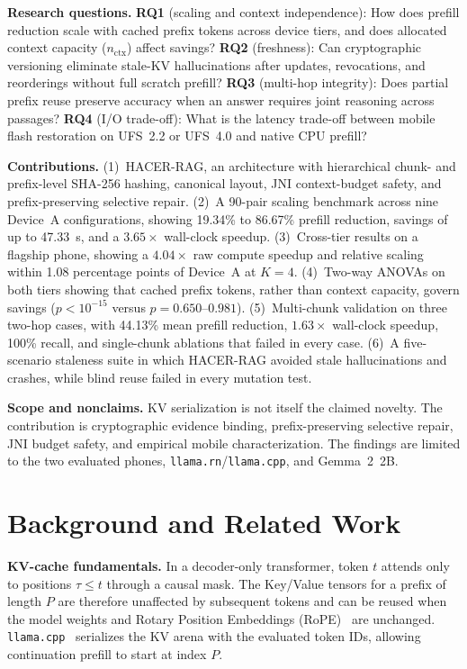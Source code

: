 \documentclass[10pt,conference]{IEEEtran}
\newcommand{\systemname}{HACER-RAG}
\begin{document}
\textbf{Research questions.} \textbf{RQ1} (scaling and context independence): How does prefill reduction scale with cached prefix tokens across device tiers, and does allocated context capacity ($n_{\text{ctx}}$) affect savings? \textbf{RQ2} (freshness): Can cryptographic versioning eliminate stale-KV hallucinations after updates, revocations, and reorderings without full scratch prefill? \textbf{RQ3} (multi-hop integrity): Does partial prefix reuse preserve accuracy when an answer requires joint reasoning across passages? \textbf{RQ4} (I/O trade-off): What is the latency trade-off between mobile flash restoration on UFS~2.2 or UFS~4.0 and native CPU prefill?

\textbf{Contributions.} (1)~\systemname{}, an architecture with hierarchical chunk- and prefix-level SHA-256 hashing, canonical layout, JNI context-budget safety, and prefix-preserving selective repair. (2)~A 90-pair scaling benchmark across nine Device~A configurations, showing 19.34\% to 86.67\% prefill reduction, savings of up to 47.33~s, and a $3.65\times$ wall-clock speedup. (3)~Cross-tier results on a flagship phone, showing a $4.04\times$ raw compute speedup and relative scaling within 1.08 percentage points of Device~A at $K{=}4$. (4)~Two-way ANOVAs on both tiers showing that cached prefix tokens, rather than context capacity, govern savings ($p<10^{-15}$ versus $p=0.650\text{--}0.981$). (5)~Multi-chunk validation on three two-hop cases, with 44.13\% mean prefill reduction, $1.63\times$ wall-clock speedup, 100\% recall, and single-chunk ablations that failed in every case. (6)~A five-scenario staleness suite in which \systemname{} avoided stale hallucinations and crashes, while blind reuse failed in every mutation test.

\textbf{Scope and nonclaims.} KV serialization is not itself the claimed novelty. The contribution is cryptographic evidence binding, prefix-preserving selective repair, JNI budget safety, and empirical mobile characterization. The findings are limited to the two evaluated phones, \texttt{llama.rn}/\allowbreak\texttt{llama.cpp}, and Gemma~2~2B.

\section{Background and Related Work}
\label{sec:background}
\textbf{KV-cache fundamentals.} In a decoder-only transformer, token $t$ attends only to positions $\tau \le t$ through a causal mask. The Key/Value tensors for a prefix of length $P$ are therefore unaffected by subsequent tokens and can be reused when the model weights and Rotary Position Embeddings (RoPE)~\cite{su2024roformer} are unchanged. \texttt{llama.cpp}~\cite{gerganov2023llamacpp} serializes the KV arena with the evaluated token IDs, allowing continuation prefill to start at index $P$.
\end{document}
